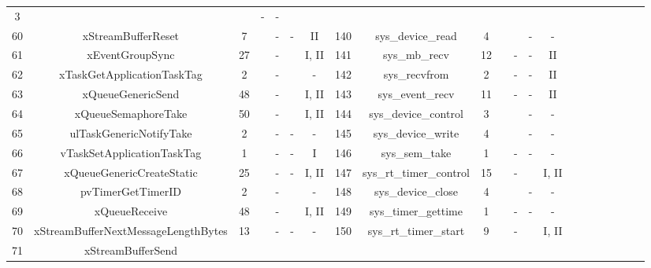 \documentclass[conference]{IEEEtran}
\newcommand{\tickYes}{\ding{52}}
\begin{document}
\begin{table}[!t]
\begin{threeparttable}
\begin{tabular}{@{}ccccccccccccccccccccc@{}}
  3 &
  \tickYes &
  \tickYes &
  - &
  - &
   &
   &
   &
   &
   &
   &
   \\
60 &
  xStreamBufferReset &
  7 &
  \tickYes &
  - &
  - &
  II &
  140 &
  sys\_device\_read &
  4 &
  \tickYes &
  \tickYes &
  - &
  - &
   &
   &
   &
   &
   &
   &
   \\
61 &
  xEventGroupSync &
  27 &
  \tickYes &
  - &
  \tickYes &
  I, II &
  141 &
  sys\_mb\_recv &
  12 &
  \tickYes &
  - &
  - &
  II &
   &
   &
   &
   &
   &
   &
   \\
62 &
  xTaskGetApplicationTaskTag &
  2 &
  \tickYes &
  - &
  \tickYes &
  - &
  142 &
  sys\_recvfrom &
  2 &
  \tickYes &
  - &
  - &
  II &
   &
   &
   &
   &
   &
   &
   \\
63 &
  xQueueGenericSend &
  48 &
  \tickYes &
  - &
  \tickYes &
  I, II &
  143 &
  sys\_event\_recv &
  11 &
  \tickYes &
  - &
  - &
  II &
   &
   &
   &
   &
   &
   &
   \\
64 &
  xQueueSemaphoreTake &
  50 &
  \tickYes &
  - &
  \tickYes &
  I, II &
  144 &
  sys\_device\_control &
  3 &
  \tickYes &
  \tickYes &
  - &
  - &
   &
   &
   &
   &
   &
   &
   \\
65 &
  ulTaskGenericNotifyTake &
  2 &
  \tickYes &
  - &
  - &
  - &
  145 &
  sys\_device\_write &
  4 &
  \tickYes &
  \tickYes &
  - &
  - &
   &
   &
   &
   &
   &
   &
   \\
66 &
  vTaskSetApplicationTaskTag &
  1 &
  \tickYes &
  - &
  - &
  I &
  146 &
  sys\_sem\_take &
  1 &
  \tickYes &
  - &
  - &
  - &
   &
   &
   &
   &
   &
   &
   \\
67 &
  xQueueGenericCreateStatic &
  25 &
  \tickYes &
  - &
  - &
  I, II &
  147 &
  sys\_rt\_timer\_control &
  15 &
  \tickYes &
  - &
  \tickYes &
  I, II &
   &
   &
   &
   &
   &
   &
   \\
68 &
  pvTimerGetTimerID &
  2 &
  \tickYes &
  - &
  \tickYes &
  - &
  148 &
  sys\_device\_close &
  4 &
  \tickYes &
  \tickYes &
  - &
  - &
   &
   &
   &
   &
   &
   &
   \\
69 &
  xQueueReceive &
  48 &
  \tickYes &
  - &
  \tickYes &
  I, II &
  149 &
  sys\_timer\_gettime &
  1 &
  \tickYes &
  - &
  - &
  - &
   &
   &
   &
   &
   &
   &
   \\
70 &
  xStreamBufferNextMessageLengthBytes &
  13 &
  \tickYes &
  - &
  - &
  - &
  150 &
  sys\_rt\_timer\_start &
  9 &
  \tickYes &
  - &
  \tickYes &
  I, II &
   &
   &
   &
   &
   &
   &
   \\
71 &
  xStreamBufferSend &

\end{tabular}
\end{threeparttable}
\end{table}
\end{document}
